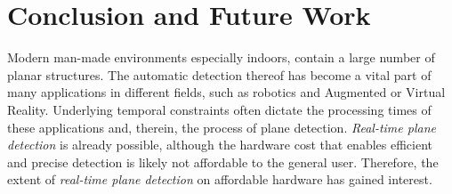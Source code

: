 \documentclass[main.tex]{subfiles}
\begin{document}
\chapter{Conclusion and Future Work}
\label{chap:concl}
Modern man-made environments especially indoors, contain a large number of planar structures.
The automatic detection thereof has become a vital part of many applications in different fields, such as robotics and Augmented or Virtual Reality. Underlying temporal constraints often dictate the processing times of these applications and, therein, the process of plane detection. \textit{Real-time plane detection} is already possible, although the hardware cost that enables efficient and precise detection is likely not affordable to the general user.
Therefore, the extent of \textit{real-time plane detection} on affordable hardware has gained interest.

\end{document}
